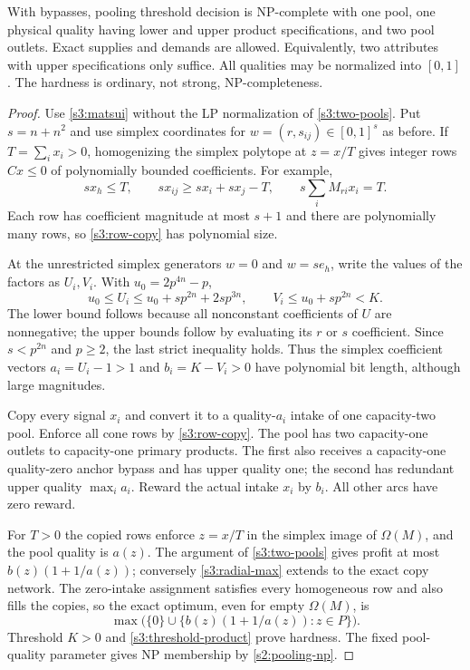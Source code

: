\begin{theorem}\label{s3:base-bypass}
With bypasses, pooling threshold decision is NP-complete with one pool,
one physical quality having lower and upper product specifications, and
two pool outlets. Exact supplies and demands are allowed. Equivalently,
two attributes with upper specifications only suffice. All qualities may
be normalized into $[0,1]$. The hardness is ordinary, not strong,
NP-completeness.
\end{theorem}
\begin{proof}
Use \cref{s3:matsui} without the LP normalization of
\cref{s3:two-pools}. Put $s=n+n^2$ and use simplex coordinates for
$w=(r,s_{ij})\in[0,1]^s$ as before. If $T=\sum_i x_i>0$, homogenizing
the simplex polytope at $z=x/T$ gives integer rows $Cx\le0$ of
polynomially bounded coefficients. For example,
\[
 sx_h\le T,\qquad sx_{ij}\ge sx_i+sx_j-T,
 \qquad s\sum_i M_{ri}x_i=T.
\]
Each row has coefficient magnitude at most $s+1$ and there are
polynomially many rows, so \cref{s3:row-copy} has polynomial size.

At the unrestricted simplex generators $w=0$ and $w=se_h$, write the
values of the factors as $U_i,V_i$. With $u_0=2p^{4n}-p$,
\begin{equation}
 u_0\le U_i\le u_0+sp^{2n}+2sp^{3n},\qquad
 V_i\le u_0+sp^{2n}<K.\label{s3:generator-bounds}
\end{equation}
The lower bound follows because all nonconstant coefficients of $U$
are nonnegative; the upper bounds follow by evaluating its $r$ or $s$
coefficient. Since $s<p^{2n}$ and $p\ge2$, the last strict inequality
holds. Thus the simplex coefficient vectors
$a_i=U_i-1>1$ and $b_i=K-V_i>0$ have polynomial bit length, although
large magnitudes.

Copy every signal $x_i$ and convert it to a quality-$a_i$ intake of
one capacity-two pool. Enforce all cone rows by \cref{s3:row-copy}.
The pool has two capacity-one outlets to capacity-one primary products.
The first also receives a capacity-one quality-zero anchor bypass and
has upper quality one; the second has redundant upper quality
$\max_i a_i$. Reward the actual intake $x_i$ by $b_i$. All other
arcs have zero reward.

For $T>0$ the copied rows enforce $z=x/T$ in the simplex image of
$\Omega(M)$, and the pool quality is $a(z)$. The argument of
\cref{s3:two-pools} gives profit at most $b(z)(1+1/a(z))$; conversely
\eqref{s3:radial-max} extends to the exact copy network. The zero-intake
assignment satisfies every homogeneous row and also fills the copies,
so the exact optimum, even for empty $\Omega(M)$, is
\begin{equation}
 \max\bigl(\{0\}\cup
 \{b(z)(1+1/a(z)):z\in P\}\bigr).\label{s3:copy-value}
\end{equation}
Threshold $K>0$ and \eqref{s3:threshold-product} prove hardness.
The fixed pool-quality parameter gives NP membership by
\cref{s2:pooling-np}.


\end{proof}
